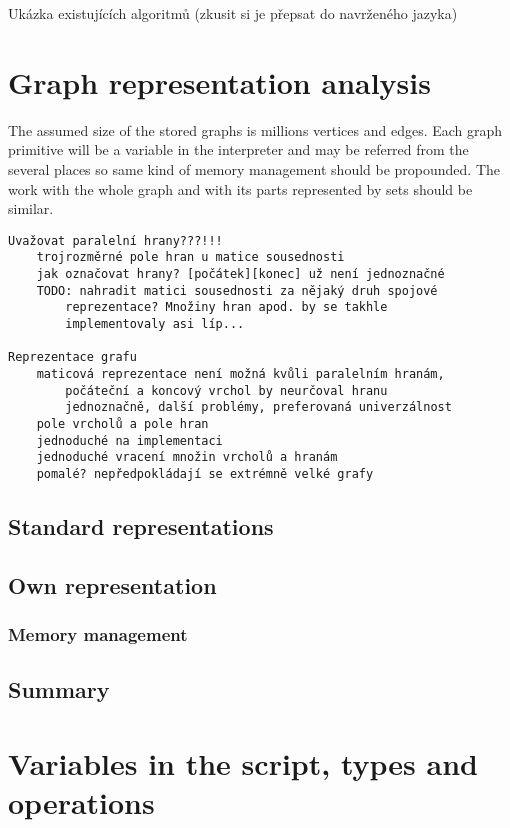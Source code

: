 \documentclass[11pt,twoside,a4paper]{book}
\begin{document}
Ukázka existujících algoritmů (zkusit si je přepsat do navrženého jazyka)

\section{Graph representation analysis}

The assumed size of the stored graphs is millions vertices and edges. Each graph primitive will be a variable in the interpreter and may be referred from the several places so same kind of memory management should be propounded. The work with the whole graph and with its parts represented by sets should be similar.


\begin{verbatim}
Uvažovat paralelní hrany???!!!
	trojrozměrné pole hran u matice sousednosti
	jak označovat hrany? [počátek][konec] už není jednoznačné
	TODO: nahradit matici sousednosti za nějaký druh spojové
		reprezentace? Množiny hran apod. by se takhle
		implementovaly asi líp...

Reprezentace grafu
	maticová reprezentace není možná kvůli paralelním hranám,
		počáteční a koncový vrchol by neurčoval hranu
		jednoznačně, další problémy, preferovaná univerzálnost
	pole vrcholů a pole hran
	jednoduché na implementaci
	jednoduché vracení množin vrcholů a hranám
	pomalé? nepředpokládají se extrémně velké grafy
\end{verbatim}


\subsection{Standard representations}

\subsection{Own representation}

\subsubsection{Memory management}

\subsection{Summary}


\section{Variables in the script, types and operations}
\end{document}
